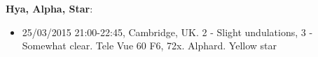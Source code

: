 {\bf Hya, Alpha, Star}:
\begin{itemize}
\item 25/03/2015 21:00-22:45, Cambridge, UK. 2 - Slight undulations, 3 - Somewhat clear. Tele Vue 60 F6, 72x. Alphard. Yellow star
\end{itemize}
